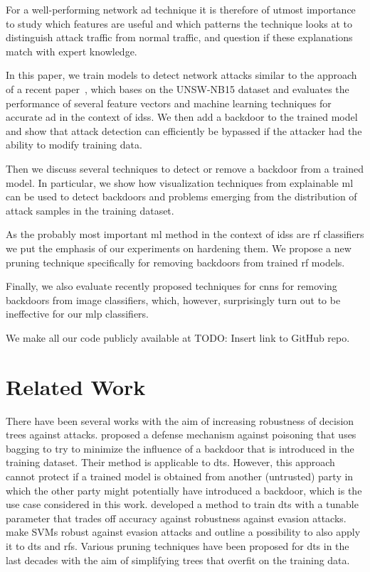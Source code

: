 \documentclass[10pt,sigconf,letterpaper,dvipsnames]{acmart}
\newcommand\note[2]{{\color{#1}#2}}
\newcommand\todo[1]{{\note{red}{TODO: #1}}}
\newcommand{\unsw}{UNSW-NB15}
\begin{document}
For a well-performing network \gls{ad} technique it is therefore of utmost importance to study which features are useful and which patterns the technique looks at to distinguish attack traffic from normal traffic, and question if these explanations match with expert knowledge.

In this paper, we train models to detect network attacks similar to the approach of a recent paper~\cite{meghdouri_analysis_2018}, which bases on the \unsw{} dataset \cite{moustafa_unsw-nb15:_2015} and evaluates the performance of several feature vectors and machine learning techniques for accurate \gls{ad} in the context of \glspl{ids}.
We then add a backdoor to the trained model and show that attack detection can efficiently be bypassed if the attacker had the ability to modify training data.

Then we discuss several techniques to detect or remove a backdoor from a trained model. In particular, we show how visualization techniques from explainable \gls{ml} can be used to detect backdoors and problems emerging from the distribution of attack samples in the training dataset.

As the probably most important \gls{ml} method in the context of \glspl{ids} are \gls{rf} classifiers we put the emphasis of our experiments on hardening them. We propose a new pruning technique specifically for removing backdoors from trained \gls{rf} models.

Finally, we also evaluate recently proposed techniques for \glspl{cnn} for removing backdoors from image classifiers, which, however, surprisingly turn out to be ineffective for our \gls{mlp} classifiers.

We make all our code publicly available at \todo{Insert link to GitHub repo}.

\section{Related Work}

There have been several works with the aim of increasing robustness of decision trees against attacks. \cite{biggio_bagging_2011} proposed a defense mechanism against poisoning that uses bagging to try to minimize the influence of a backdoor that is introduced in the training dataset. Their method is applicable to \glspl{dt}. However, this approach cannot protect if a trained model is obtained from another (untrusted) party in which the other party might potentially have introduced a backdoor, which is the use case considered in this work. \cite{chen_robust_2019} developed a method to train \glspl{dt} with a tunable parameter that trades off accuracy against robustness against evasion attacks. \cite{russu_secure_2016} make SVMs robust against evasion attacks and outline a possibility to also apply it to \glspl{dt} and \glspl{rf}.
Various pruning techniques have been proposed for \glspl{dt} in the last decades \cite{esposito_comparative_1997} with the aim of simplifying trees that overfit on the training data. 
\end{document}
